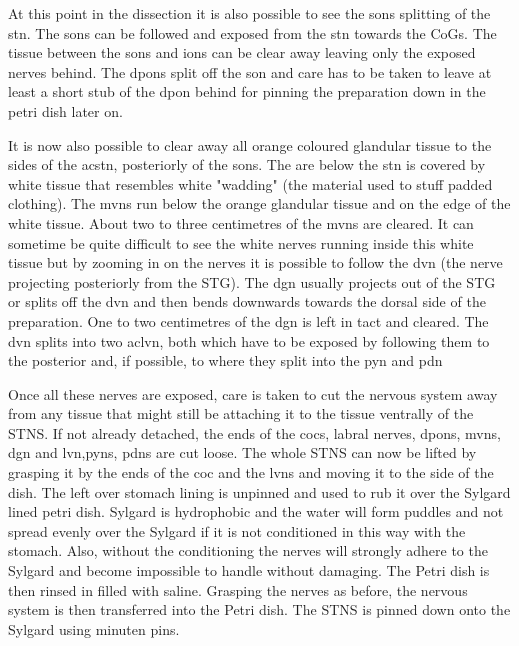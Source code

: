 At this point in the dissection it is also possible to see the \acp{son} splitting of the \ac{stn}. The \acp{son} can be followed and exposed from the \ac{stn} towards the \acp{CoG}. The tissue between the \acp{son} and \acp{ion} can be clear away leaving only the exposed nerves behind. The \acp{dpon} split off the \ac{son} and care has to be taken to leave at least a short stub of the \ac{dpon} behind for pinning the preparation down in the petri dish later on.

It is now also possible to clear away all orange coloured glandular tissue to the sides of the ac{stn}, posteriorly of the \acp{son}. The are below the \ac{stn} is covered by white tissue that resembles white "wadding" (the material used to stuff padded clothing). The \acp{mvn} run below the orange glandular tissue and on the edge of the white tissue. About two to three centimetres of the \acp{mvn} are cleared. It can sometime be quite difficult to see the white nerves running inside this white tissue but by zooming in on the nerves it is possible to follow the \ac{dvn} (the nerve projecting posteriorly from the \ac{STG}). The \ac{dgn} usually projects out of the \ac{STG} or splits off the \ac{dvn} and then bends downwards towards the dorsal side of the preparation. One to two centimetres of the \ac{dgn} is left in tact and cleared. The \ac{dvn} splits into two ac{lvn}, both which have to be exposed by following them to the posterior and, if possible, to where they split into the \ac{pyn} and \ac{pdn}

Once all these nerves are exposed, care is taken to cut the nervous system away from any tissue that might still be attaching it to the tissue ventrally of the \ac{STNS}. If not already detached, the ends of the \acp{coc}, labral nerves, \acp{dpon}, \acp{mvn}, \ac{dgn} and \ac{lvn},\acp{pyn}, \acp{pdn} are cut loose. The whole \ac{STNS} can now be lifted by grasping it by the ends of the \ac{coc} and the \acp{lvn} and moving it to the side of the dish. The left over stomach lining is unpinned and used to rub it over the Sylgard lined petri dish. Sylgard is hydrophobic and the water will form puddles and not spread evenly over the Sylgard if it is not conditioned in this way with the stomach. Also, without the conditioning the nerves will strongly adhere to the Sylgard and become impossible to handle without damaging. The Petri dish is then rinsed in filled with saline. Grasping the nerves as before, the nervous system is then transferred into the Petri dish. The \ac{STNS} is pinned down onto the Sylgard using minuten pins.

